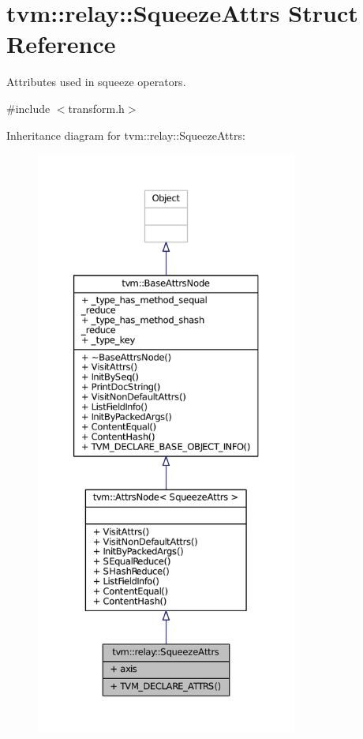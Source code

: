 \hypertarget{structtvm_1_1relay_1_1SqueezeAttrs}{}\section{tvm\+:\+:relay\+:\+:Squeeze\+Attrs Struct Reference}
\label{structtvm_1_1relay_1_1SqueezeAttrs}


Attributes used in squeeze operators.  




{\ttfamily \#include $<$transform.\+h$>$}



Inheritance diagram for tvm\+:\+:relay\+:\+:Squeeze\+Attrs\+:
\nopagebreak
\begin{figure}[H]
\begin{center}
\leavevmode
\includegraphics[height=550pt]{structtvm_1_1relay_1_1SqueezeAttrs__inherit__graph}
\end{center}
\end{figure}


